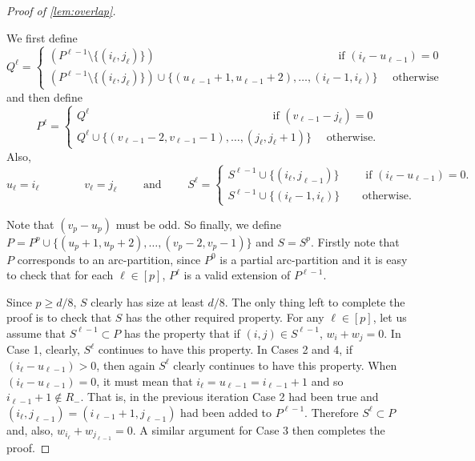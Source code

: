 \documentclass[10pt,a4paper]{article}
\theoremstyle{definition}%
\theoremstyle{plain}
\begin{document}
\begin{proof}[Proof of \autoref{lem:overlap}]
\begin{enumerate}
        We first define
        \[
            Q^\ell = \begin{cases}
                (P^{\ell-1} \setminus \{(i_\ell, j_\ell)\}) \qquad \qquad \qquad \qquad  \qquad \qquad \qquad \qquad \text{ if } (i_\ell - u_{\ell-1}) = 0 \\
                (P^{\ell-1} \setminus \{(i_\ell, j_\ell)\}) \cup \{(u_{\ell-1}+1, u_{\ell-1}+2), \ldots, (i_\ell -1, i_\ell)\} \quad \text{ otherwise}
            \end{cases} 
        \]
        and then define
        \[
            P^\ell = \begin{cases}
                Q^\ell \qquad \qquad \qquad \qquad \qquad \qquad \qquad \qquad \text{ if } (v_{\ell-1} - j_\ell) = 0 \\
                Q^\ell \cup \{(v_{\ell-1}-2, v_{\ell-1}-1), \ldots, (j_\ell, j_\ell +1)\} \quad \text{ otherwise.}
            \end{cases}
        \]
        Also,
        \[
            u_\ell = i_\ell \qquad \qquad v_\ell = j_\ell \qquad \text{ and } \qquad S^\ell = \begin{cases}
                S^{\ell -1} \cup \{(i_\ell, j_{\ell -1})\} \qquad \text{ if } (i_\ell - u_{\ell-1}) = 0.  \\
                S^{\ell -1} \cup \{(i_\ell -1, i_\ell)\} \qquad \text{otherwise.}
            \end{cases}
        \]
    \end{enumerate}  
    Note that $(v_p - u_p)$ must be odd.
    So finally, we define $P = P^p \cup \{(u_p+1, u_p+2), \ldots, (v_p-2, v_p-1)\}$ and $S = S^p$.
    Firstly note that $P$ corresponds to an arc-partition, since $P^0$ is a partial arc-partition and it is easy to check that for each $\ell \in [p]$, $P^\ell$ is a valid extension of $P^{\ell-1}$.
    
    Since $p \geq d/8$, $S$ clearly has size at least $d/8$.
    The only thing left to complete the proof is to check that $S$ has the other required property.
    For any $\ell \in [p]$, let us assume that $S^{\ell -1} \subset P$ has the property that if $(i,j) \in S^{\ell -1}$, $w_i + w_j = 0$.    
    In Case 1, clearly, $S^\ell$ continues to have this property.
    In Cases 2 and 4, if $(i_\ell - u_{\ell-1}) > 0$, then again $S^\ell$ clearly continues to have this property.
    When $(i_\ell - u_{\ell-1}) = 0$, it must mean that $i_\ell = u_{\ell-1} = i_{\ell -1} + 1$ and so $i_{\ell -1} + 1 \not\in R_-$.
    That is, in the previous iteration Case 2 had been true and $(i_\ell, j_{\ell -1}) = (i_{\ell -1} + 1, j_{\ell -1})$ had been added to $P^{\ell -1}$.
    Therefore $S^\ell \subset P$ and, also, $w_{i_\ell} + w_{j_{\ell -1}} = 0$.
    A similar argument for Case 3 then completes the proof.
\end{proof}
\end{document}
